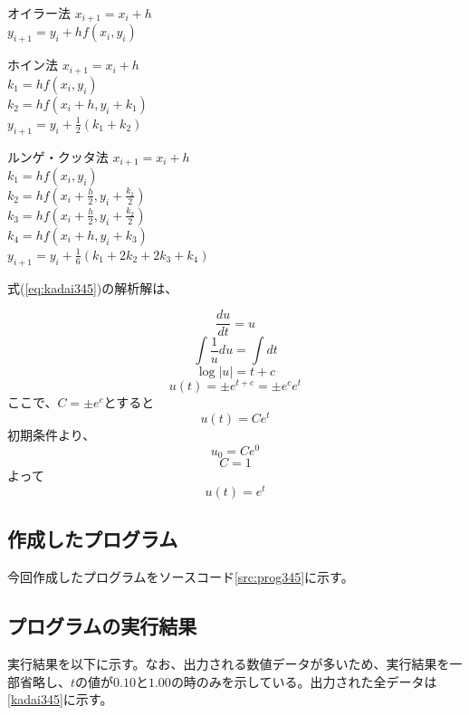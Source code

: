 \documentclass[10pt,titlepage]{jsarticle}
\begin{document}
\begin{itembox}[l]{オイラー法}
\centering
	$x_{i+1}=x_i+h$ \\
	$y_{i+1}=y_i+hf(x_i,y_i)$ 
\end{itembox}

\begin{itembox}[l]{ホイン法}
\centering
	$x_{i+1}=x_i+h$\\
	$k_1=hf(x_i,y_i)$\\
	$k_2=hf(x_i+h,y_i+k_1)$\\
	$y_{i+1}=y_i+\frac{1}{2}(k_1+k_2)$
\end{itembox}

\begin{itembox}[l]{ルンゲ・クッタ法}
\centering
	$x_{i+1}=x_i+h$\\
	$k_1=hf(x_i,y_i)$\\
	$k_2=hf\left(x_i+\frac{h}{2},y_i+\frac{k_1}{2}\right)$\\
	$k_3=hf \left(x_i+\frac{h}{2},y_i+\frac{k_2}{2}\right)$\\
	$k_4=hf\left(x_i+h,y_i+k_3\right)$\\
	$y_{i+1}=y_i+\frac{1}{6}\left(k_1+2k_2+2k_3+k_4\right)$\\
\end{itembox}

式(\ref{eq:kadai345})の解析解は、

\[\frac{du}{dt} = u\]
\[\int \frac{1}{u}du=\int dt\]
\[\log |u|=t+c\]
\[u(t)=\pm e^{t+c}=\pm e^c e^t\]
ここで、$C=\pm e^c$とすると
\[u(t)=Ce^t\]
初期条件より、
\[u_0=Ce^0\]
\[C=1\]
よって
\[u(t)=e^t\]

\subsection{作成したプログラム}
今回作成したプログラムをソースコード\ref{src:prog345}に示す。




\subsection{プログラムの実行結果}
実行結果を以下に示す。なお、出力される数値データが多いため、実行結果を一部省略し、$t$の値が$0.10$と$1.00$の時のみを示している。出力された全データは\ref{kadai345}に示す。
\begin{oframed}
\end{oframed}
\end{document}
